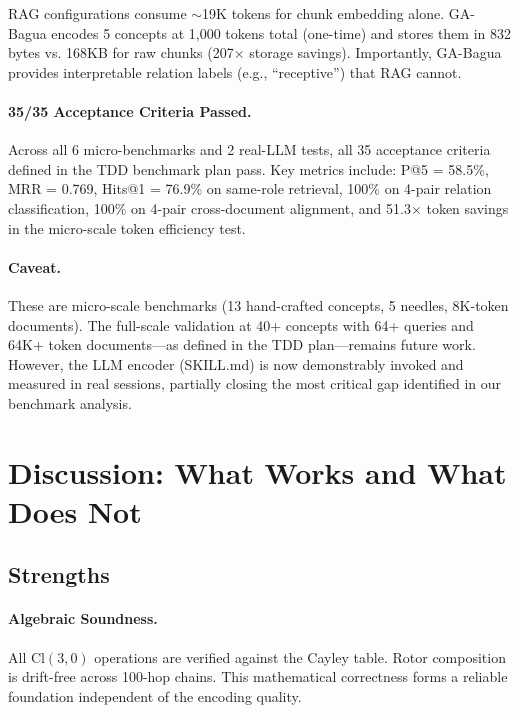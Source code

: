 \documentclass[11pt,a4paper]{article}
\newcommand{\Cl}{\mathrm{Cl}}
\begin{document}
RAG configurations consume $\sim$19K tokens for chunk embedding alone. GA-Bagua
encodes 5 concepts at 1,000 tokens total (one-time) and stores them in 832 bytes
vs. 168KB for raw chunks (207$\times$ storage savings). Importantly, GA-Bagua
provides interpretable relation labels (e.g., ``receptive'') that RAG cannot.

\paragraph{35/35 Acceptance Criteria Passed.} Across all 6 micro-benchmarks and
2 real-LLM tests, all 35 acceptance criteria defined in the TDD benchmark plan
pass. Key metrics include: P@5 = 58.5\%, MRR = 0.769, Hits@1 = 76.9\% on
same-role retrieval, 100\% on 4-pair relation classification, 100\% on 4-pair
cross-document alignment, and 51.3$\times$ token savings in the micro-scale
token efficiency test.

\paragraph{Caveat.} These are micro-scale benchmarks (13 hand-crafted concepts,
5 needles, 8K-token documents). The full-scale validation at 40+ concepts with
64+ queries and 64K+ token documents---as defined in the TDD plan---remains
future work. However, the LLM encoder (SKILL.md) is now demonstrably invoked
and measured in real sessions, partially closing the most critical gap
identified in our benchmark analysis.

\section{Discussion: What Works and What Does Not}

\subsection{Strengths}

\paragraph{Algebraic Soundness.} All $\Cl(3,0)$ operations are verified
against the Cayley table. Rotor composition is drift-free across 100-hop
chains. This mathematical correctness forms a reliable foundation independent
of the encoding quality.
\end{document}
